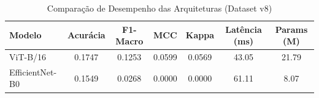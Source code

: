 \begin{table}[h]
\centering
\caption{Comparação de Desempenho das Arquiteturas (Dataset v8)}
\label{tab:comparacao_modelos}
\begin{tabular}{lcccccc}
\hline
Modelo & Acurácia & F1-Macro & MCC & Kappa & Latência (ms) & Params (M) \\ \hline
ViT-B/16 & 0.1747 & 0.1253 & 0.0599 & 0.0569 & 43.05 & 21.79 \\
EfficientNet-B0 & 0.1549 & 0.0268 & 0.0000 & 0.0000 & 61.11 & 8.07 \\
\hline
\end{tabular}
\end{table}